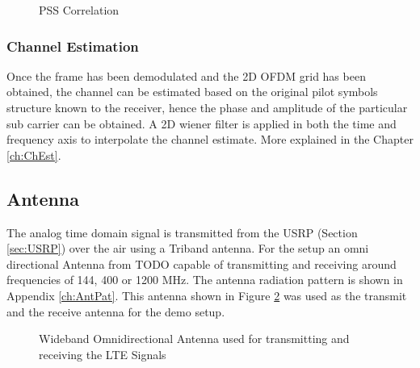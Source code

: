 \begin{figure}[H]
    \begin{center}
        \caption{PSS Correlation}
        \label{fig:PSSCorr}
    \end{center}
\end{figure}

\subsubsection{Channel Estimation}

Once the frame has been demodulated and the 2D OFDM grid has been obtained, the channel can be estimated based on the original pilot symbols structure known to the receiver, hence the phase and amplitude of the particular sub carrier can be obtained. A 2D wiener filter is applied in both the time and frequency axis to interpolate the channel estimate. More explained in the Chapter \ref{ch:ChEst}.


\subsection{Antenna}
The analog time domain signal is transmitted from the USRP (Section \ref{sec:USRP}) over the air using a Triband antenna. For the setup an omni directional Antenna from TODO capable of transmitting and receiving around frequencies of 144, 400 or 1200 MHz. The antenna radiation pattern is shown in Appendix \ref{ch:AntPat}. This antenna shown in Figure \ref{fig:USRPAnt} was used as the transmit and the receive antenna for the demo setup.

\begin{figure}[H]
    \begin{center}
        \caption{Wideband Omnidirectional Antenna used for transmitting and receiving the LTE Signals}
        \label{fig:USRPAnt}
    \end{center}
\end{figure}
